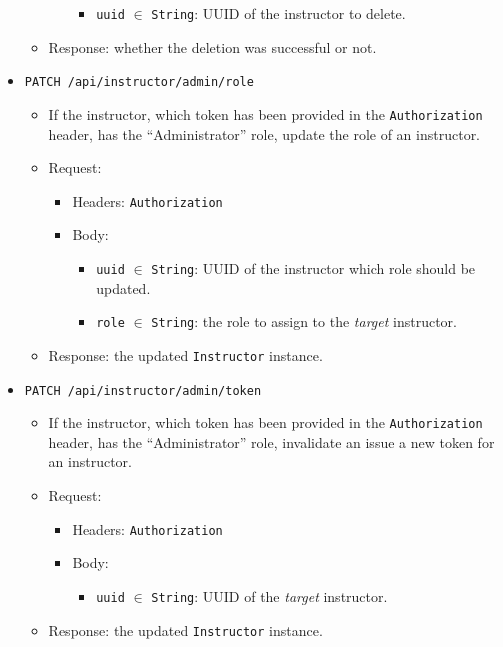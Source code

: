 \begin{chapterBody}
\begin{itemize}
\begin{itemize}
\begin{itemize}
            \begin{itemize}
                \item \texttt{uuid} $ \in $ \texttt{String}: UUID of the 
instructor to delete.
            \end{itemize}
        \end{itemize}
        \item Response: whether the deletion was successful or not.
    \end{itemize}
    \item \texttt{PATCH /api/instructor/admin/role}
    \begin{itemize}
        \item If the instructor, which token has been provided in the
\texttt{Authorization} header, has the ``Administrator'' role,  update the role
of an instructor.
        \item Request:
        \begin{itemize}
            \item Headers: \texttt{Authorization}
            \item Body:
            \begin{itemize}
                \item \texttt{uuid} $ \in $ \texttt{String}:
UUID of the instructor which role should be updated.
                \item \texttt{role} $ \in $ \texttt{String}: the role to assign
to the \textit{target} instructor.
            \end{itemize}
        \end{itemize}
        \item Response: the updated \texttt{Instructor} instance.
    \end{itemize}
    \item \texttt{PATCH /api/instructor/admin/token}
    \begin{itemize}
        \item If the instructor, which token has been provided in the
\texttt{Authorization} header, has the ``Administrator'' role, invalidate an
issue a new token for an instructor.
        \item Request:
        \begin{itemize}
            \item Headers: \texttt{Authorization}
            \item Body:
            \begin{itemize}
                \item \texttt{uuid} $ \in $ \texttt{String}: UUID of the
\textit{target} instructor.
            \end{itemize}
        \end{itemize}
        \item Response: the updated \texttt{Instructor} instance.
    \end{itemize}
\end{itemize}


\end{chapterBody}
